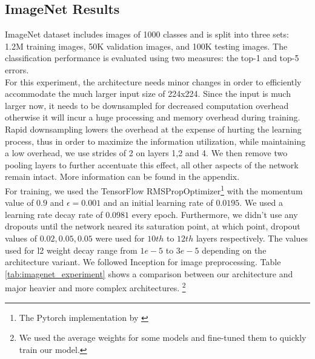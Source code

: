 \documentclass{article} \usepackage{lets_keepit_simple,times}
\begin{document}
\subsection{ImageNet Results}
ImageNet\cite{Russakovsky_ImageNet_2015} dataset includes images of 1000 classes and is split into three sets: 1.2M training images, 50K validation images, and 100K testing images. The classification performance is evaluated using two measures: the top-1 and top-5 errors.\\
For this experiment, the architecture needs minor changes in order to efficiently accommodate the much larger input size of 224x224. Since the input is much larger now, it needs to be downsampled for decreased computation overhead otherwise it will incur a huge processing and memory overhead during training. 
Rapid downsampling lowers the overhead at the expense of hurting the learning process, thus in order to maximize the information utilization, while maintaining a low overhead, we use strides of 2 on layers 1,2 and 4. We then remove two pooling layers to further accentuate this effect, all other aspects of the network remain intact. More information can be found in the appendix.\\ 
For training, we used the TensorFlow RMSPropOptimizer\footnote{The Pytorch implementation by \cite{rw2019timm}} with the momentum value of $0.9$ and $\epsilon=0.001$ and an initial learning rate of $0.0195$. We used a learning rate decay rate of $0.0981$ every epoch. Furthermore, we didn't use any dropouts until the network neared its saturation point, at which point, dropout values of $0.02,0.05,0.05$ were used for $10th$ to $12th$ layers respectively. The values used for l2 weight decay range from $1e-5$ to $3e-5$ depending on the architecture variant.  
We followed Inception \cite{Szegedy_inceptiov4_2016} for image preprocessing. Table \ref{tab:imagenet_experiment} shows a comparison between our architecture and major heavier and more complex architectures. \footnote{We used the average weights for some models and fine-tuned them to quickly train our model.}
\end{document}

